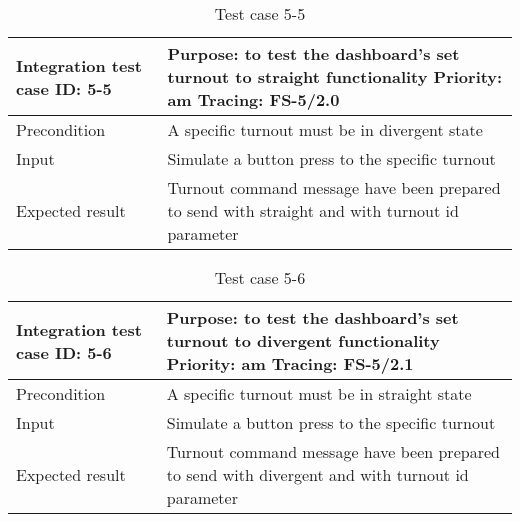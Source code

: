 \begin{table}[H]
	\caption{Test case 5-5}
	\label{table:TCase-FS5-5}
	\begin{center}
		\renewcommand{\arraystretch}{1.8}
		\begin{tabu} 
			to 0.9 \textwidth
			{  X[0.3, l] X[l] }
			\toprule
			Integration test case ID: 5-5 & Purpose: to test the dashboard's set turnout to straight functionality  \newline Priority: am \newline Tracing: FS-5/2.0 \\ \midrule
			Precondition                  & A specific turnout must be in divergent state                                                                            \\
			Input                         & Simulate a button press to the specific turnout                                                                          \\
			Expected result               & Turnout command message have been prepared to send with straight and with turnout id parameter                           \\ \bottomrule
		\end{tabu}
	\end{center}
\end{table}

\begin{table}[H]
	\caption{Test case 5-6}
	\label{table:TCase-FS5-6}
	\begin{center}
		\renewcommand{\arraystretch}{1.8}
		\begin{tabu} 
			to 0.9 \textwidth
			{  X[0.3, l] X[l] }
			\toprule
			Integration test case ID: 5-6 & Purpose: to test the dashboard's set turnout to divergent functionality \newline Priority: am \newline Tracing: FS-5/2.1 \\ \midrule
			Precondition                  & A specific turnout must be in straight state                                                                             \\
			Input                         & Simulate a button press to the specific turnout                                                                          \\
			Expected result               & Turnout command message have been prepared to send with divergent and with turnout id parameter                          \\ \bottomrule
		\end{tabu}
	\end{center}
\end{table}

